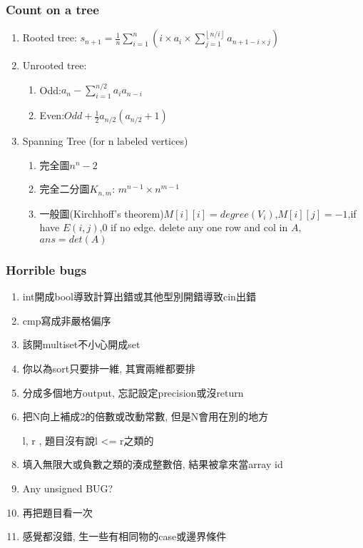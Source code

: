 \subsubsection{Count on a tree}
\begin{enumerate}\itemsep = -3pt
	\item Rooted tree: $s_{n+1}=\frac{1}{n}\sum_{i=1}^{n}(i\times a_i\times \sum_{j=1}^{\left \lfloor  n/i\right \rfloor} a_{n+1-i\times j})$
	\item Unrooted tree: 
	\begin{enumerate}\itemsep = -2pt
		\item Odd:$a_n-\sum_{i=1}^{n/2}a_ia_{n-i}$
		\item Even:$Odd+\frac{1}{2}a_{n/2}(a_{n/2}+1)$
	\end{enumerate}
	\item Spanning Tree (for n labeled vertices)
	\begin{enumerate}\itemsep = -2pt
		\item 完全圖$n^n-2$
		\item 完全二分圖$K_{n,m}$: $m^{n-1} \times n^{m-1}$
		\item 一般圖(Kirchhoff's theorem)$M[i][i]=degree(V_i)$,$M[i][j]=-1$,if have $E(i,j)$,$0$ if no edge. delete any one row and col in $A$, $ans = det(A)$
	\end{enumerate}
\end{enumerate}

\subsubsection{Horrible bugs}
\begin{enumerate}\itemsep = -3pt
	\item int開成bool導致計算出錯或其他型別開錯導致cin出錯
	\item cmp寫成非嚴格偏序
	\item 該開multiset不小心開成set
	\item 你以為sort只要排一維, 其實兩維都要排
	\item 分成多個地方output, 忘記設定precision或沒return
	\item 把N向上補成2的倍數或改動常數, 但是N會用在別的地方
	\item [l, r], 題目沒有說l <= r之類的
	\item 填入無限大或負數之類的湊成整數倍, 結果被拿來當array id
	\item Any unsigned BUG?
	\item 再把題目看一次
	\item 感覺都沒錯, 生一些有相同物的case或邊界條件
\end{enumerate}

%